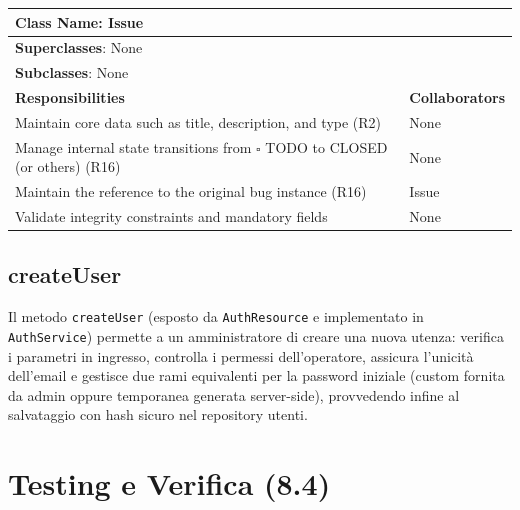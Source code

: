 ﻿\documentclass[11pt,a4paper]{article}
\begin{document}
\begin{tabularx}{\textwidth}{|X|X|}
    \hline
    \multicolumn{2}{|l|}{\textbf{Class Name}: Issue}                                                           \\ \hline
    \multicolumn{2}{|l|}{\textbf{Superclasses}: None}                                                          \\ \hline
    \multicolumn{2}{|l|}{\textbf{Subclasses}: None}                                                            \\ \hline
    \textbf{Responsibilities}                                                         & \textbf{Collaborators} \\ \hline
    Maintain core data such as title, description, and type (R2)                      & None                   \\ \hline
    Manage internal state transitions from $\square$ TODO to CLOSED (or others) (R16) & None                   \\ \hline
    Maintain the reference to the original bug instance (R16)                         & Issue                  \\ \hline
    Validate integrity constraints and mandatory fields                               & None                   \\ \hline
\end{tabularx}

\subsection{createUser}
Il metodo \texttt{createUser} (esposto da \texttt{AuthResource} e implementato in \texttt{AuthService}) permette a un amministratore di creare una nuova utenza: verifica i parametri in ingresso, controlla i permessi dell'operatore, assicura l'unicità dell'email e gestisce due rami equivalenti per la password iniziale (custom fornita da admin oppure temporanea generata server-side), provvedendo infine al salvataggio con hash sicuro nel repository utenti.

\clearpage



\section{Testing e Verifica (8.4)}
\end{document}
